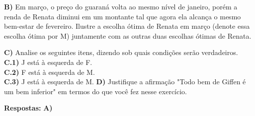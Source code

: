 \begin{flushleft}
\textbf{B)} Em março, o preço do guaraná volta ao mesmo nível de janeiro, porém a renda de Renata diminui em um montante tal que agora ela alcança o mesmo bem-estar de fevereiro. Ilustre a escolha ótima de Renata em março (denote essa escolha ótima por M) juntamente
com as outras duas escolhas ótimas de Renata.
\singlespacing

\textbf{C)} Analise os seguintes itens, dizendo sob quais condições serão verdadeiros.
\\
\textbf{C.1)} J está à esquerda de F.
\\
\textbf{C.2)} F está à esquerda de M.
\\
\textbf{C.3)} J está à esquerda de M.
\singlespacing
\textbf{D)} Justifique a afirmação "Todo bem de Giffen é um bem inferior" em termos do que você fez nesse exercício.

\singlespacing

\textbf{Respostas:}
\singlespacing
\textbf{A)} 
\singlespacing

\begin{center}

\end{center}
\end{flushleft}
